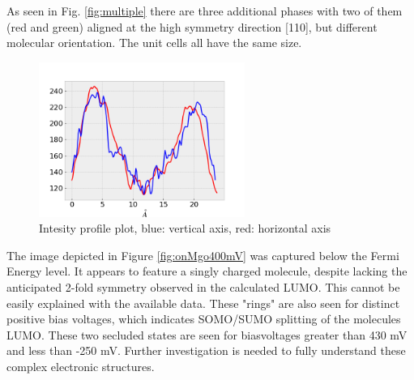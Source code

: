 \noindent As seen in Fig. \ref{fig:multiple} there are three additional phases with two of them (red and green) aligned at the high symmetry direction [110], but different molecular orientation.
The unit cells all have the same size. 
\begin{figure}
    \centering
    \includegraphics[width=0.6\textwidth]{graphics/ready_images_phthalo/profile_plot_2Hpc_on_mgo.png}
    \caption{
        Intesity profile plot,
        blue: vertical axis,
        red: horizontal axis}
    \label{fig:intensitymgo}
\end{figure}
\noindent The image depicted in Figure \ref{fig:onMgo400mV} was captured below the Fermi Energy level. 
It appears to feature a singly charged molecule, despite lacking the anticipated 2-fold symmetry observed in the calculated LUMO.
This cannot be easily explained with the available data.
These "rings" are also seen for distinct positive bias voltages, which indicates SOMO/SUMO splitting of the molecules LUMO.
These two secluded states are seen for biasvoltages greater than 430 mV and less than -250 mV. 
Further investigation is needed to fully understand these complex electronic structures.

